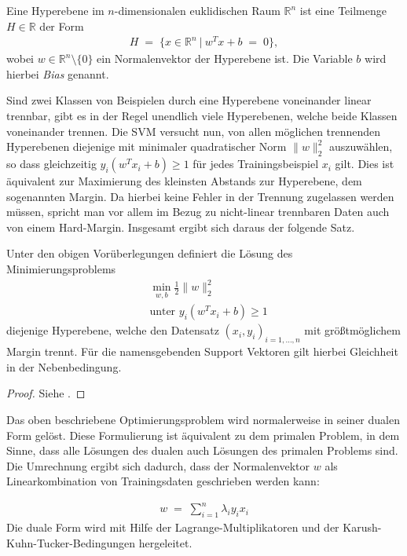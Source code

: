 \begin{defi}[Hyperebene]
	Eine Hyperebene im \(n\)-dimensionalen euklidischen Raum \(\mathbb{R}^n\) ist eine Teilmenge \(H\in\mathbb{R}\) der Form
	\begin{align*}
		H\;=\;\lbrace x\in\mathbb{R}^n\:|\:w^Tx+b\;=\;0\rbrace,
	\end{align*}
	wobei \(w\in\mathbb{R}^n\setminus\lbrace0\rbrace\) ein Normalenvektor der Hyperebene ist. Die Variable \(b\) wird hierbei \textit{Bias} genannt.
\end{defi}

Sind zwei Klassen von Beispielen durch eine Hyperebene voneinander linear trennbar, gibt es in der Regel unendlich viele Hyperebenen, welche beide Klassen voneinander trennen. Die SVM versucht nun, von allen möglichen trennenden Hyperebenen diejenige mit minimaler quadratischer Norm \(\|w\|^2_2\) auszuwählen, so dass gleichzeitig \(y_i\left(w^Tx_i+b\right)\geq 1\) für jedes Trainingsbeispiel \(x_i\) gilt. Dies ist äquivalent zur Maximierung des kleinsten Abstands zur Hyperebene, dem sogenannten Margin. Da hierbei keine Fehler in der Trennung zugelassen werden müssen, spricht man vor allem im Bezug zu nicht-linear trennbaren Daten auch von einem Hard-Margin. Insgesamt ergibt sich daraus der folgende Satz.

\begin{satz}
	Unter den obigen Vorüberlegungen definiert die Lösung des Minimierungsproblems
	\begin{align*}
		&\min_{w,b} \frac{1}{2}\|w\|^2_2\\
		&\text{unter } y_i\left(w^Tx_i+b\right)\geq 1
	\end{align*}
	diejenige Hyperebene, welche den Datensatz \((x_i,y_i)_{i=1,\dots,n}\) mit größtmöglichem Margin trennt. Für die namensgebenden Support Vektoren gilt hierbei Gleichheit in der Nebenbedingung. 
\end{satz}

\begin{proof}
	Siehe \cite{SVM}.
\end{proof}

Das oben beschriebene Optimierungsproblem wird normalerweise in seiner dualen Form gelöst. Diese Formulierung ist äquivalent zu dem primalen Problem, in dem Sinne, dass alle Lösungen des dualen auch Lösungen des primalen Problems sind. Die Umrechnung ergibt sich dadurch, dass der Normalenvektor \(w\) als Linearkombination von Trainingsdaten geschrieben werden kann:

\begin{align*}
	w\;=\;\sum_{i=1}^{n}\lambda_i y_i x_i
\end{align*}
Die duale Form wird mit Hilfe der Lagrange-Multiplikatoren und der Karush-Kuhn-Tucker-Bedingungen hergeleitet.

